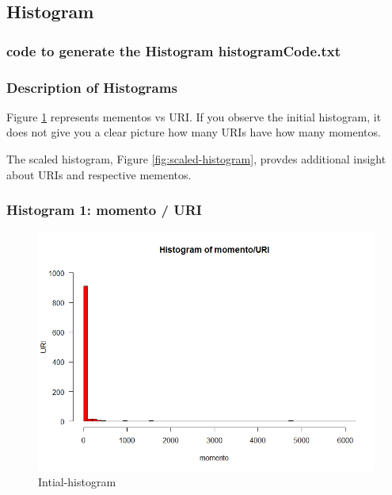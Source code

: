 \documentclass[12pt]{article}
\begin{document}
\subsection{Histogram }
\subsubsection{code to generate the Histogram histogramCode.txt}

\subsubsection{Description of Histograms}
Figure \ref{fig:initial-histogram} represents mementos vs URI. If you observe the initial histogram, it does not give you a clear picture how many URIs have how many momentos.

The scaled histogram, Figure \ref{fig:scaled-histogram}, provdes additional insight about URIs and respective mementos.

\subsubsection{Histogram 1: momento / URI}
\begin{figure}[ht]
\includegraphics[scale=0.7]{../Q2/histogramMomentoURI_1}
\centering
\caption{Intial-histogram}
\label{fig:initial-histogram}
\end{figure}
\newpage
\end{document}
